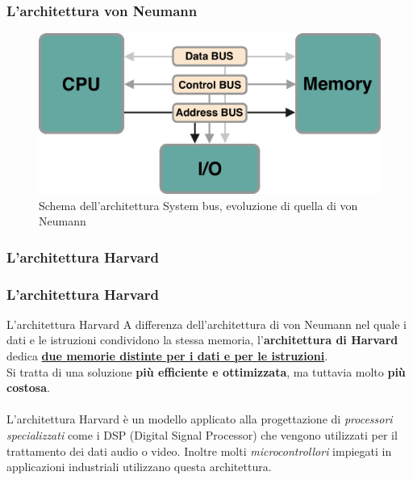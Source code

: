 \begin{frame}
	\frametitle{L'architettura von Neumann}
	
	\begin{figure}[!htbp]
		\centering 
		\includegraphics[width=0.9\linewidth]{images/3_architetture/architecture_von_neumann_system_bus.pdf}
			\caption{Schema dell'architettura System bus, evoluzione di quella di von Neumann} 
	\end{figure}
	
\end{frame}





\subsubsection[L'architettura Harvard]{L'architettura Harvard}

\begin{frame}
	\frametitle{L'architettura Harvard}
	
	\begin{block}{L'architettura Harvard}
		A differenza dell'architettura di von Neumann nel quale i dati e le istruzioni condividono la stessa memoria, l'\textbf{architettura di Harvard} dedica \underline{\textbf{due memorie distinte per i dati e per le istruzioni}}.\\
		Si tratta di una soluzione \textbf{più efficiente e ottimizzata}, ma tuttavia molto \textbf{più costosa}.\\~\\
		L'architettura Harvard è un modello applicato alla progettazione di 	\textit{processori specializzati} come i DSP (Digital Signal Processor) che vengono utilizzati per il trattamento dei dati audio o video. Inoltre molti \textit{microcontrollori} impiegati in applicazioni industriali utilizzano questa architettura.
	\end{block}
	
	
\end{frame}


